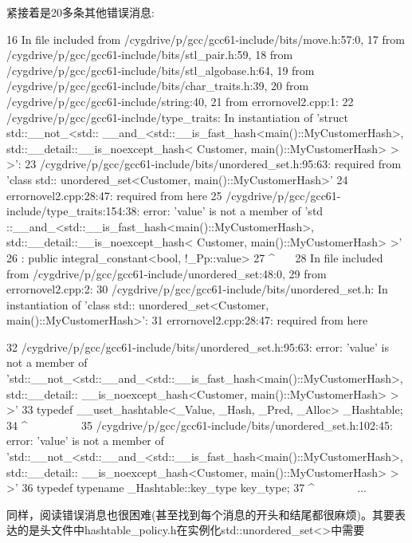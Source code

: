 紧接着是20多条其他错误消息:

{\scriptsize
\begin{shell}
16 In file included from /cygdrive/p/gcc/gcc61-include/bits/move.h:57:0,
17                  from /cygdrive/p/gcc/gcc61-include/bits/stl_pair.h:59,
18                  from /cygdrive/p/gcc/gcc61-include/bits/stl_algobase.h:64,
19 from /cygdrive/p/gcc/gcc61-include/bits/char_traits.h:39,
20                  from /cygdrive/p/gcc/gcc61-include/string:40,
21                  from errornovel2.cpp:1:
22 /cygdrive/p/gcc/gcc61-include/type_traits: In instantiation of ’struct std::__not_<std::
   __and_<std::__is_fast_hash<main()::MyCustomerHash>, std::__detail::__is_noexcept_hash<
   Customer, main()::MyCustomerHash> > >’:
23 /cygdrive/p/gcc/gcc61-include/bits/unordered_set.h:95:63: required from ’class std::
   unordered_set<Customer, main()::MyCustomerHash>’
24 errornovel2.cpp:28:47: required from here
25 /cygdrive/p/gcc/gcc61-include/type_traits:154:38: error: ’value’ is not a member of ’std
   ::__and_<std::__is_fast_hash<main()::MyCustomerHash>, std::__detail::__is_noexcept_hash<
   Customer, main()::MyCustomerHash> >’
26      : public integral_constant<bool, !_Pp::value>
27                                                  ^~~~
28 In file included from /cygdrive/p/gcc/gcc61-include/unordered_set:48:0,
29                  from errornovel2.cpp:2:
30 /cygdrive/p/gcc/gcc61-include/bits/unordered_set.h: In instantiation of ’class std::
   unordered_set<Customer, main()::MyCustomerHash>’:
31 errornovel2.cpp:28:47: required from here
\end{shell}
}
{\scriptsize
\begin{shell}
32 /cygdrive/p/gcc/gcc61-include/bits/unordered_set.h:95:63: error: ’value’ is not a member
   of ’std::__not_<std::__and_<std::__is_fast_hash<main()::MyCustomerHash>, std::__detail::
   __is_noexcept_hash<Customer, main()::MyCustomerHash> > >’
33        typedef __uset_hashtable<_Value, _Hash, _Pred, _Alloc> _Hashtable;
34                                                                                  ^~~~~~~~~~
35 /cygdrive/p/gcc/gcc61-include/bits/unordered_set.h:102:45: error: ’value’ is not a member
   of ’std::__not_<std::__and_<std::__is_fast_hash<main()::MyCustomerHash>, std::__detail::
   __is_noexcept_hash<Customer, main()::MyCustomerHash> > >’
36 typedef typename _Hashtable::key_type key_type;
37                                                     ^~~~~~~~
...
\end{shell}
}

同样，阅读错误消息也很困难(甚至找到每个消息的开头和结尾都很麻烦)。其要表达的是头文件中hashtable\_policy.h在实例化std::unordered\_set<>中需要

